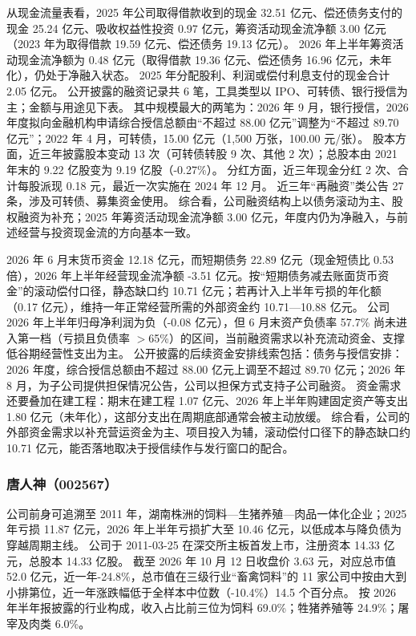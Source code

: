  从现金流量表看，2025 年公司取得借款收到的现金 32.51 亿元、偿还债务支付的现金 25.24 亿元、吸收权益性投资 0.97 亿元，筹资活动现金流净额 3.00 亿元（2023 年为取得借款 19.59 亿元、偿还债务 19.13 亿元）。 2026 年上半年筹资活动现金流净额为 0.48 亿元（取得借款 19.36 亿元、偿还债务 16.96 亿元，未年化），仍处于净融入状态。 2025 年分配股利、利润或偿付利息支付的现金合计 2.05 亿元。 公开披露的融资记录共 6 笔，工具类型以 IPO、可转债、银行授信为主；金额与用途见下表。 其中规模最大的两笔为：2026 年 9 月，银行授信，2026 年度拟向金融机构申请综合授信总额由“不超过 88.00 亿元”调整为“不超过 89.70 亿元”；2022 年 4 月，可转债，15.00 亿元（1,500 万张，100.00 元/张）。 股本方面，近三年披露股本变动 13 次（可转债转股 9 次、其他 2 次）；总股本由 2021 年末的 9.22 亿股变为 9.19 亿股（-0.27\%）。 分红方面，近三年现金分红 2 次、合计每股派现 0.18 元，最近一次实施在 2024 年 12 月。 近三年“再融资”类公告 27 条，涉及可转债、募集资金使用。 综合看，公司融资结构上以债务滚动为主、股权融资为补充；2025 年筹资活动现金流净额 3.00 亿元，年度内仍为净融入，与前述经营与投资现金流的方向基本一致。

 2026 年 6 月末货币资金 12.18 亿元，而短期债务 22.89 亿元（现金短债比 0.53 倍），2026 年上半年经营现金流净额 -3.51 亿元。按“短期债务减去账面货币资金”的滚动偿付口径，静态缺口约 10.71 亿元；若再计入上半年亏损的年化额（0.17 亿元），维持一年正常经营所需的外部资金约 10.71---10.88 亿元。 公司 2026 年上半年归母净利润为负（-0.08 亿元），但 6 月末资产负债率 57.7\% 尚未进入第一档（亏损且负债率 $>$65\%）的区间，当前融资需求以补充流动资金、支撑低谷期经营性支出为主。 公开披露的后续资金安排线索包括：债务与授信安排：2026 年度，综合授信总额由不超过 88.00 亿元上调至不超过 89.70 亿元；2026 年 8 月，为子公司提供担保情况公告，公司以担保方式支持子公司融资。 资金需求还要叠加在建工程：期末在建工程 1.07 亿元、2026 年上半年购建固定资产等支出 1.80 亿元（未年化），这部分支出在周期底部通常会被主动放缓。 综合看，公司的外部资金需求以补充营运资金为主、项目投入为辅，滚动偿付口径下的静态缺口约 10.71 亿元，能否落地取决于授信续作与发行窗口的配合。




\subsubsection{唐人神（002567）}
\label{co:002567}

 公司前身可追溯至 2011 年，湖南株洲的饲料—生猪养殖—肉品一体化企业；2025 年亏损 11.87 亿元，2026 年上半年亏损扩大至 10.46 亿元，以低成本与降负债为穿越周期主线。 公司于 2011-03-25 在深交所主板首发上市，注册资本 14.33 亿元，总股本 14.33 亿股。 截至 2026 年 10 月 12 日收盘价 3.63 元，对应总市值 52.0 亿元，近一年-24.8\%，总市值在三级行业“畜禽饲料”的 11 家公司中按由大到小排第位，近一年涨跌幅低于全样本中位数（-10.4\%）14.5 个百分点。 按 2026 年半年报披露的行业构成，收入占比前三位为饲料 69.0\%；牲猪养殖等 24.9\%；屠宰及肉类 6.0\%。

